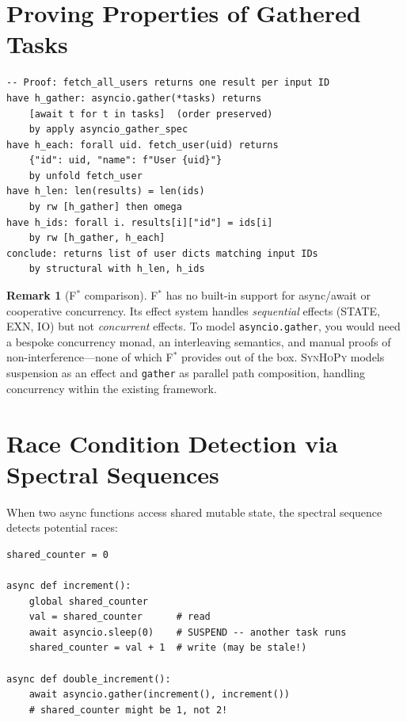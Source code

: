 \documentclass[11pt,a4paper]{report}
\theoremstyle{definition}
\newtheorem{remark}[definition]{Remark}
\theoremstyle{plain}
\newcommand{\fstar}{F$^{*}$}
\newcommand{\synhopy}{\textsc{SynHoPy}}
\begin{document}
\section{Proving Properties of Gathered Tasks}

\begin{lstlisting}[style=proof]
-- Proof: fetch_all_users returns one result per input ID
have h_gather: asyncio.gather(*tasks) returns
    [await t for t in tasks]  (order preserved)
    by apply asyncio_gather_spec
have h_each: forall uid. fetch_user(uid) returns
    {"id": uid, "name": f"User {uid}"}
    by unfold fetch_user
have h_len: len(results) = len(ids)
    by rw [h_gather] then omega
have h_ids: forall i. results[i]["id"] = ids[i]
    by rw [h_gather, h_each]
conclude: returns list of user dicts matching input IDs
    by structural with h_len, h_ids
\end{lstlisting}

\begin{remark}[\fstar{} comparison]
\fstar{} has no built-in support for async/await or cooperative concurrency.
Its effect system handles \emph{sequential} effects (STATE, EXN, IO) but not
\emph{concurrent} effects.  To model \texttt{asyncio.gather}, you would need
a bespoke concurrency monad, an interleaving semantics, and manual proofs
of non-interference---none of which \fstar{} provides out of the box.
\synhopy{} models suspension as an effect and \texttt{gather} as parallel path
composition, handling concurrency within the existing framework.
\end{remark}

\section{Race Condition Detection via Spectral Sequences}

When two async functions access shared mutable state, the spectral sequence
detects potential races:

\begin{lstlisting}[style=python]
shared_counter = 0

async def increment():
    global shared_counter
    val = shared_counter      # read
    await asyncio.sleep(0)    # SUSPEND -- another task runs
    shared_counter = val + 1  # write (may be stale!)

async def double_increment():
    await asyncio.gather(increment(), increment())
    # shared_counter might be 1, not 2!
\end{lstlisting}
\end{document}
